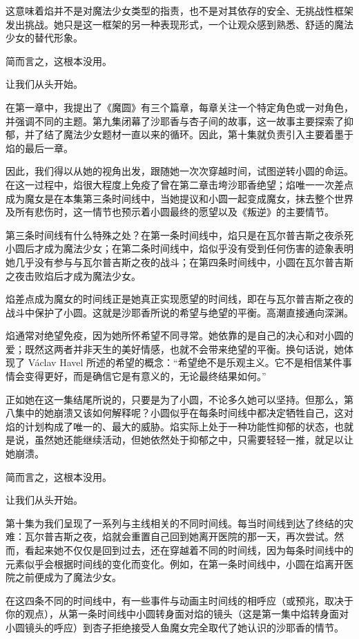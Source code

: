 这意味着焰并不是对魔法少女类型的指责，也不是对其依存的安全、无挑战性框架发出挑战。她只是这一框架的另一种表现形式，一个让观众感到熟悉、舒适的魔法少女的替代形象。

简而言之，这根本没用。

让我们从头开始。

在第一章中，我提出了《魔圆》有三个篇章，每章关注一个特定角色或一对角色，并强调不同的主题。第九集闭幕了沙耶香与杏子间的故事，这一故事主要探索了抑郁，并了结了魔法少女题材一直以来的循环。因此，第十集就负责引入主要着墨于焰的最后一章。

因此，我们得以从她的视角出发，跟随她一次次穿越时间，试图逆转小圆的命运。在这一过程中，焰很大程度上免疫了曾在第二章击垮沙耶香绝望；焰唯一一次差点成为魔女是在本集第三条时间线中，当她提议和小圆一起变成魔女，抹去整个世界及所有悲伤时，这一情节也预示着小圆最终的愿望以及《叛逆》的主要情节。

第三条时间线有什么特殊之处？在第一条时间线中，焰只是在瓦尔普吉斯之夜杀死小圆后才成为魔法少女；在第二条时间线中，焰似乎没有受到任何伤害的迹象表明她几乎没有参与与瓦尔普吉斯之夜的战斗；在第四条时间线中，小圆在瓦尔普吉斯之夜击败焰后才成为魔法少女。

焰差点成为魔女的时间线正是她真正实现愿望的时间线，即在与瓦尔普吉斯之夜的战斗中保护了小圆。这就是沙耶香所说的希望与绝望的平衡。高潮直接通向深渊。

焰通常对绝望免疫，因为她所怀希望不同寻常。她依靠的是自己的决心和对小圆的爱；既然这两者并非天生的美好情感，也就不会带来绝望的平衡。换句话说，她体现了 Václav Havel 所述的希望的概念：“希望绝不是乐观主义。它不是相信某件事情会变得更好，而是确信它是有意义的，无论最终结果如何。”\cite{ref64}

正如她在这一集结尾所说的，只要是为了小圆，不论多久她可以坚持。但那么，第八集中的她崩溃又该如何解释呢？小圆似乎在每条时间线中都决定牺牲自己，这对焰的计划构成了唯一的、最大的威胁。焰实际上处于一种功能性抑郁的状态，也就是说，虽然她还能继续活动，但她依然处于抑郁之中，只需要轻轻一推，就足以让她崩溃。

简而言之，这根本没用。

让我们从头开始。

第十集为我们呈现了一系列与主线相关的不同时间线。每当时间线到达了终结的灾难：瓦尔普吉斯之夜，焰就会重置自己回到她离开医院的那一天，再次尝试。然而，看起来她不仅仅是回到过去，还在穿越着不同的时间线，因为每条时间线中的元素似乎会根据时间线的变化而变化。例如，在第一条时间线中，小圆在焰离开医院之前便成为了魔法少女。

在这四条不同的时间线中，有一些事件与动画主时间线的相呼应（或预兆，取决于你的观点），从第一条时间线中小圆转身面对焰的镜头（这是第一集中焰转身面对小圆镜头的呼应）到杏子拒绝接受人鱼魔女完全取代了她认识的沙耶香的情节。

